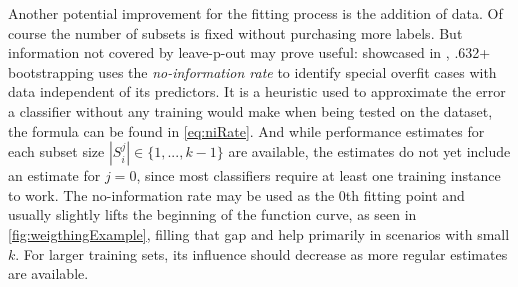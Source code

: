 Another potential improvement for the fitting process is the addition of data. Of course the number of subsets is fixed without purchasing more labels. But information not covered by leave-p-out may prove useful: showcased in \cite{EfronEtAl1997}, .632+ bootstrapping uses the \textit{no-information rate} to identify special overfit cases with data independent of its predictors. It is a heuristic used to approximate the error a classifier without any training would make when being tested on the dataset, the formula can be found in \ref{eq:niRate}. And while performance estimates for each subset size $|S^j_i| \in \{1, ..., k-1\}$ are available, the estimates do not yet include an estimate for $j = 0$, since most classifiers require at least one training instance to work. The no-information rate may be used as the 0th fitting point and usually slightly lifts the beginning of the function curve, as seen in \ref{fig:weigthingExample}, filling that gap and help primarily in scenarios with small $k$. For larger training sets, its influence should decrease as more regular estimates are available.